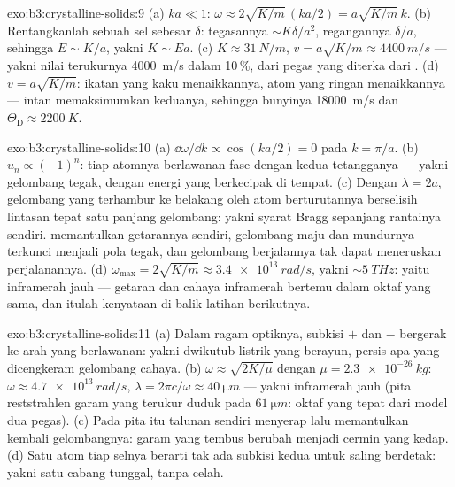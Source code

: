 \begin{solution}{exo:b3:crystalline-solids:9}
(a) $ka \ll 1$: $\omega \approx 2\sqrt{K/m}\,(ka/2) =
a\sqrt{K/m}\,k$. (b) Rentangkanlah sebuah sel sebesar $\delta$: tegasannya $\sim
K\delta/a^2$, regangannya $\delta/a$, sehingga $E \sim K/a$, yakni $K \sim
Ea$. (c) $K \approx \qty{31}{N/m}$, $v = a\sqrt{K/m} \approx
\qty{4400}{m/s}$ --- yakni nilai terukurnya \qty{4000}{m/s} dalam 10\,\%,
dari pegas yang diterka dari . (d) $v = a\sqrt{K/m}$:
ikatan yang kaku menaikkannya, atom yang ringan menaikkannya --- intan
memaksimumkan keduanya, sehingga bunyinya \qty{18000}{m/s} dan $\Theta_{\text{D}} \approx
\qty{2200}{K}$.
\end{solution}

\begin{solution}{exo:b3:crystalline-solids:10}
(a) $\dd\omega/\dd k \propto \cos(ka/2) = 0$ pada $k = \pi/a$. (b)
$u_n \propto (-1)^n$: tiap atomnya berlawanan fase dengan kedua
tetangganya --- yakni gelombang tegak, dengan energi yang berkecipak di tempat. (c)
Dengan $\lambda = 2a$, gelombang yang terhambur ke belakang oleh atom
berturutannya berselisih lintasan tepat satu panjang gelombang: yakni syarat Bragg
sepanjang rantainya sendiri.  memantulkan getarannya sendiri,
gelombang maju dan mundurnya terkunci menjadi pola tegak, dan
gelombang berjalannya tak dapat meneruskan perjalanannya. (d) $\omega_{\text{max}} = 2\sqrt{K/m} \approx
\qty{3.4e13}{rad/s}$, yakni $\sim\qty{5}{THz}$: yaitu inframerah jauh
--- getaran  dan cahaya inframerah bertemu dalam oktaf yang sama,
dan itulah kenyataan di balik latihan berikutnya.
\end{solution}

\begin{solution}{exo:b3:crystalline-solids:11}
(a) Dalam ragam optiknya, subkisi $+$ dan $-$ bergerak ke arah yang
berlawanan: yakni dwikutub listrik yang berayun, persis apa yang dicengkeram
gelombang cahaya. (b) $\omega \approx \sqrt{2K/\mu}$ dengan $\mu =
\qty{2.3e-26}{kg}$: $\omega \approx \qty{4.7e13}{rad/s}$,
$\lambda = 2\pi c/\omega \approx \qty{40}{\micro m}$ --- yakni inframerah
jauh (pita reststrahlen garam yang terukur duduk pada
$\qty{61}{\micro m}$: oktaf yang tepat dari model dua pegas). (c)
Pada pita itu talunan  sendiri menyerap lalu memantulkan kembali
gelombangnya: garam yang tembus berubah menjadi cermin yang kedap. (d) Satu atom tiap
selnya berarti tak ada subkisi kedua untuk saling berdetak: yakni satu cabang tunggal,
tanpa celah.
\end{solution}


